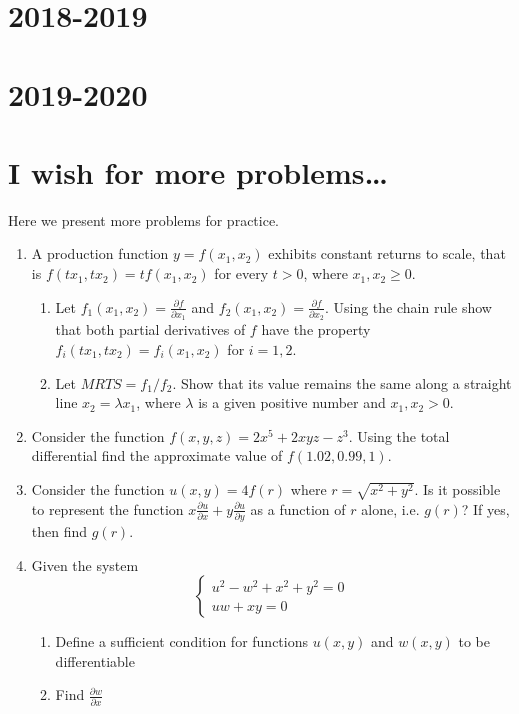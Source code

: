 \documentclass[12pt]{article} %
\theoremstyle{definition} %
\begin{document}
\section{2018-2019}





\section{2019-2020}




\section{I wish for more problems\ldots}

Here we present more problems for practice.

\begin{enumerate}
\item A production function $y=f(x_1, x_2)$ exhibits constant returns to scale, that is $f(tx_1,tx_2)=tf(x_1,x_2)$ for every $t>0$, where $x_1, x_2 \geq 0$.
\begin{enumerate}
\item Let $f_1(x_1,x_2)=\frac{\partial f}{\partial x_1}$ and $f_2(x_1,x_2)=\frac{\partial f}{\partial x_2}$. Using the chain rule show that both partial derivatives of $f$ have the property $f_i(tx_1,tx_2)=f_i(x_1,x_2)$ for $i=1,2$.
\item Let $MRTS=f_1/f_2$. Show that its value remains the same along a straight line $x_2=\lambda x_1$, where $\lambda$ is a given positive number and $x_1, x_2>0$.
\end{enumerate}

\item Consider the function $f(x,y,z)=2x^5+2xyz-z^3$. Using the total differential find the approximate value of $f(1.02,0.99,1)$.

\item Consider the function $u(x,y)=4f(r)$ where $r=\sqrt{x^2+y^2}$. Is it possible to represent the function $x\frac{\partial u}{\partial x}+y\frac{\partial u}{\partial y}$ as a function of $r$ alone, i.e. $g(r)$? If yes, then find $g(r)$.

\item Given the system
\begin{equation} \nonumber
\begin{cases}
u^2-w^2+x^2+y^2=0 \\
uw+xy=0
\end{cases}
\end{equation}
\begin{enumerate}
\item Define a sufficient condition for functions $u(x,y)$ and $w(x,y)$ to be differentiable
\item Find $\frac{\partial w}{\partial x}$
\end{enumerate}

\end{enumerate}
\end{document}
